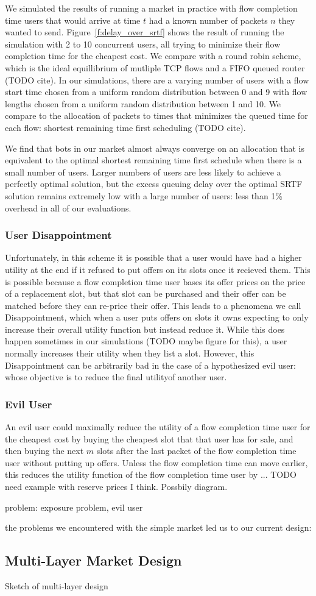 We simulated the results of running a market in practice with flow completion time users that would arrive at time $t$ had a known number of packets $n$ they wanted to send.
Figure~\ref{f:delay_over_srtf} shows the result of running the simulation with 2 to 10 concurrent users, all trying to minimize their flow completion time for the cheapest cost.
We compare with a round robin scheme, which is the ideal equillibrium of mutliple TCP flows and a FIFO queued router (TODO cite).
In our simulations, there are a varying number of users with a flow start time chosen from a uniform random distribution between 0 and 9 with flow lengths chosen from a uniform random distribution between 1 and 10. We compare to the allocation of packets to times that minimizes the queued time for each flow: shortest remaining time first scheduling (TODO cite).

We find that bots in our market almost always converge on an allocation that is equivalent to the optimal shortest remaining time first schedule when there is a small number of users. Larger numbers of users are less likely to achieve a perfectly optimal solution, but the excess queuing delay over the optimal SRTF solution remains extremely low with a large number of users: less than 1\% overhead in all of our evaluations.

\subsubsection{User Disappointment}
Unfortunately, in this scheme it is possible that a user would have had a higher utility at the end if it refused to put offers on its slots once it recieved them.
This is possible because a flow completion time user bases its offer prices on the price of a replacement slot, but that slot can be purchased and their offer can be matched before they can re-price their offer.
This leads to a phenomena we call Disappointment, which when a user puts offers on slots it owns expecting to only increase their overall utility function but instead reduce it.
While this does happen sometimes in our simulations (TODO maybe figure for this), a user normally increases their utility when they list a slot.
However, this Disappointment can be arbitrarily bad in the case of a hypothesized evil user: whose objective is to reduce the final utilityof another user.
\subsubsection{Evil User}
An evil user could maximally reduce the utility of a flow completion time user for the cheapest cost by buying the cheapest slot that that user has for sale, and then buying the next $m$ slots after the last packet of the flow completion time user without putting up offers. Unless the flow completion time can move earlier, this reduces the utility function of the flow completion time user by ... TODO need example with reserve prices I think. Possbily diagram.

problem: exposure problem, evil user

the problems we encountered with the simple market led us to our current design:
\subsection{Multi-Layer Market Design}

Sketch of multi-layer design
